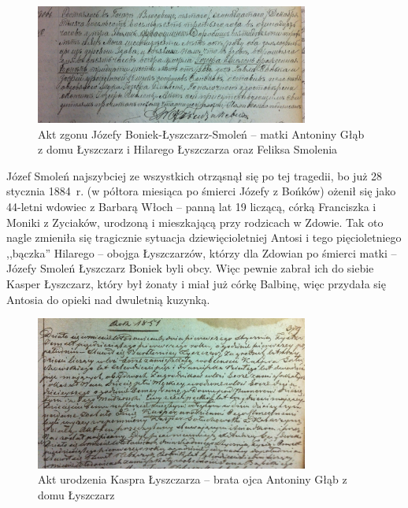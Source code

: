 \begin{figure}[!h]
\begin{center}
\includegraphics[width=0.8\textwidth]{zdjecia/akt_zgonu_jozefy_boniek.jpg}
\caption{Akt zgonu Józefy Boniek-Łyszczarz-Smoleń -- matki Antoniny Głąb z domu Łyszczarz i Hilarego Łyszczarza oraz Feliksa Smolenia}
\label{rys:akt_zgonu_jozefy_boniek}
\end{center}
\end{figure}

Józef Smoleń najszybciej ze wszystkich otrząsnął się po tej tragedii, bo już 28 stycznia 1884~r. (w półtora miesiąca po śmierci Józefy z Bońków) ożenił się jako 44-letni wdowiec z Barbarą Włoch -- panną lat 19 liczącą, córką Franciszka i Moniki z Zyciaków, urodzoną i mieszkającą przy rodzicach w Zdowie. Tak oto nagle zmieniła się tragicznie sytuacja dziewięcioletniej Antosi i tego pięcioletniego ,,bączka'' Hilarego -- obojga Łyszczarzów, którzy dla Zdowian po śmierci matki -- Józefy Smoleń Łyszczarz Boniek byli obcy. Więc pewnie zabrał ich do siebie Kasper Łyszczarz, który był żonaty i miał już córkę Balbinę, więc przydała się Antosia do opieki nad dwuletnią kuzynką.

\begin{figure}[!h]
\begin{center}
\includegraphics[width=0.8\textwidth]{zdjecia/akt_urodzenia_kaspra_lyszczarza.jpg}
\caption[Akt urodzenia Kaspra Łyszczarza]{Akt urodzenia Kaspra Łyszczarza -- brata ojca Antoniny Głąb z domu Łyszczarz}
\label{rys:akt_urodzenia_kaspra_lyszczarza}
\end{center}
\end{figure}

